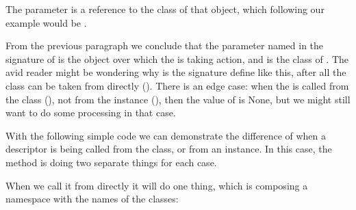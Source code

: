 \documentclass[a4paper,10pt,english]{sphinxmanual}
\begin{document}
The  parameter is a reference to the class of that object, which following our example
would be .

From the previous paragraph we conclude that the parameter named  in the
signature of  is the object over which the  is taking action, and  is
the class of . The avid reader might be wondering why is the signature define like
this, after all the class can be taken from  directly (). There is an edge case:
when the  is called from the class (), not from the instance (), then the value of  is None,
but we might still want to do some processing in that case.

With the following simple code we can demonstrate the difference of when a descriptor is
being called from the class, or from an instance. In this case, the  method is doing
two separate things for each case.

\begin{sphinxVerbatim}[commandchars=\\\{\}]
 
       
           
             
         

 
      
\end{sphinxVerbatim}

When we call it from  directly it will do one thing, which is composing a
namespace with the names of the classes:
\end{document}

